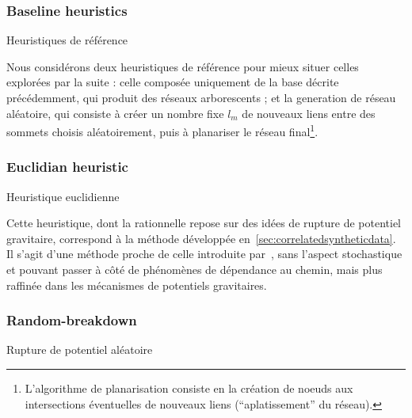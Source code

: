 \subsubsection{Baseline heuristics}{Heuristiques de référence}

Nous considérons deux heuristiques de référence pour mieux situer celles explorées par la suite : celle composée uniquement de la base décrite précédemment, qui produit des réseaux arborescents ; et la generation de réseau aléatoire, qui consiste à créer un nombre fixe $l_m$ de nouveaux liens entre des sommets choisis aléatoirement, puis à planariser le réseau final\footnote{L'algorithme de planarisation consiste en la création de noeuds aux intersections éventuelles de nouveaux liens (``aplatissement'' du réseau).}.



\subsubsection{Euclidian heuristic}{Heuristique euclidienne}



Cette heuristique, dont la rationnelle repose sur des idées de rupture de potentiel gravitaire, correspond à la méthode développée en~\ref{sec:correlatedsyntheticdata}. Il s'agit d'une méthode proche de celle introduite par~\cite{schmitt2014modelisation}, sans l'aspect stochastique et pouvant passer à côté de phénomènes de dépendance au chemin, mais plus raffinée dans les mécanismes de potentiels gravitaires.



\subsubsection{Random-breakdown}{Rupture de potentiel aléatoire}

